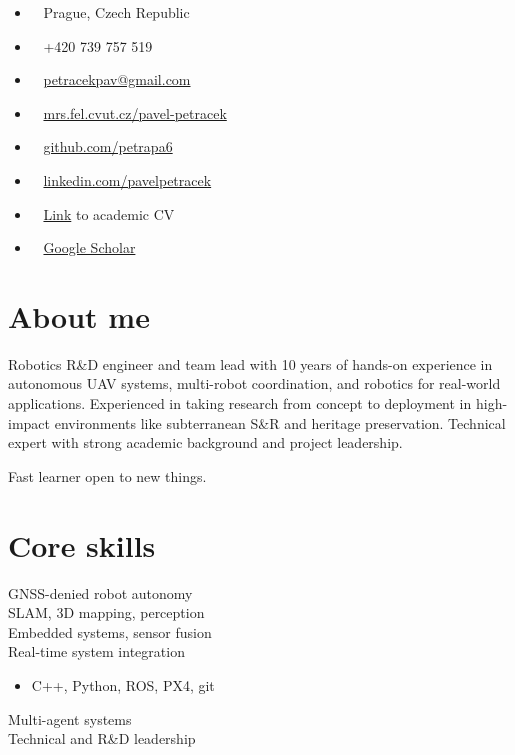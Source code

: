 \documentclass[12pt,a4paper]{article}
\newcommand\Colorhref[3][ref]{\href{#2}{\color{#1}#3}}
\newcommand{\whitesquare}{\raisebox{0.5ex}{\textcolor{white}{\rule{0.5ex}{0.5ex}}}}
\begin{document}
\begin{paracol}{2}
\vspace{5mm}
\begin{itemize}
\item \faLocationArrow~ Prague, Czech Republic
\item \faPhone~ +420 739 757 519
\item \faEnvelope~ \Colorhref{mailto:petracekpav@gmail.com}{petracekpav@gmail.com}
\item \faHome~ \Colorhref{https://mrs.fel.cvut.cz/pavel-petracek}{mrs.fel.cvut.cz/pavel-petracek}
\item \faGithub~ \Colorhref{https://github.com/petrapa6}{github.com/petrapa6}
\item \faLinkedin~ \Colorhref{https://www.linkedin.com/in/pavelpetracek/}{linkedin.com/pavelpetracek}
\item \faStickyNote~ \Colorhref{https://raw.githubusercontent.com/petrapa6/cv/master/academic_cv.pdf}{Link} to academic CV
\item \faGoogle~ \Colorhref{https://scholar.google.com/citations?user=IwzN6MQAAAAJ}{Google Scholar}
\end{itemize}

\vspace{0.6em}
\section*{About me}
Robotics R\&D engineer and team lead with 10 years of hands-on experience in autonomous UAV systems, multi-robot coordination, and robotics for real-world applications.
Experienced in taking research from concept to deployment in high-impact environments like subterranean S\&R and heritage preservation.
Technical expert with strong academic background and project leadership.

\vspace{0.4em}
\noindent

\vspace{0.4em}
\noindent
Fast learner open to new things.

\vspace{0.6em}
\section*{Core skills}
GNSS-denied robot autonomy\\
SLAM, 3D mapping, perception\\
Embedded systems, sensor fusion\\
Real-time system integration
\begin{itemize}[label=\whitesquare, left=1.0em]
  \item C++, Python, ROS, PX4, git
\end{itemize}
Multi-agent systems\\
Technical and R\&D leadership


\end{paracol}
\end{document}
